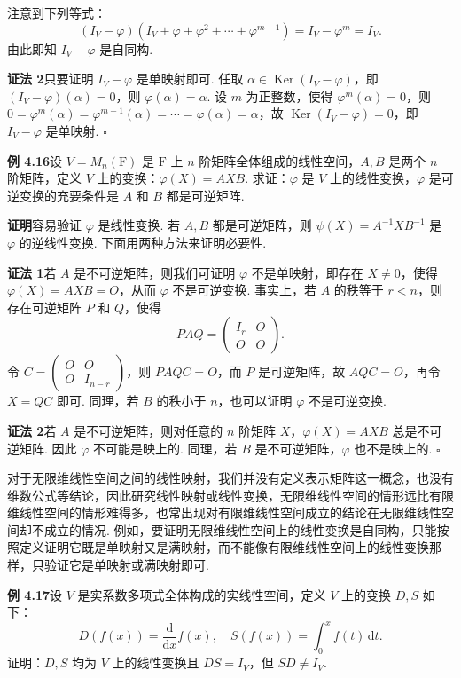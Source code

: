 \documentclass[UTF8,12pt,a4paper,fontset=fandol]{ctexart}
\begin{document}
注意到下列等式：
\[
(I_V-\varphi)(I_V+\varphi+\varphi^2+\cdots+\varphi^{m-1})=I_V-\varphi^m=I_V.
\]
由此即知 $I_V-\varphi$ 是自同构.

\noindent\textbf{证法 2}\quad 只要证明 $I_V-\varphi$ 是单映射即可. 任取 $\alpha\in\operatorname{Ker}(I_V-\varphi)$，即 $(I_V-\varphi)(\alpha)=0$，则 $\varphi(\alpha)=\alpha$. 设 $m$ 为正整数，使得 $\varphi^m(\alpha)=0$，则 $0=\varphi^m(\alpha)=\varphi^{m-1}(\alpha)=\cdots=\varphi(\alpha)=\alpha$，故 $\operatorname{Ker}(I_V-\varphi)=0$，即 $I_V-\varphi$ 是单映射. $\square$

\noindent\textbf{例 4.16}\quad 设 $V=M_n(\mathrm{F})$ 是 $\mathrm{F}$ 上 $n$ 阶矩阵全体组成的线性空间，$A,B$ 是两个 $n$ 阶矩阵，定义 $V$ 上的变换：$\varphi(X)=AXB$. 求证：$\varphi$ 是 $V$ 上的线性变换，$\varphi$ 是可逆变换的充要条件是 $A$ 和 $B$ 都是可逆矩阵.

\noindent\textbf{证明}\quad 容易验证 $\varphi$ 是线性变换. 若 $A,B$ 都是可逆矩阵，则 $\psi(X)=A^{-1}XB^{-1}$ 是 $\varphi$ 的逆线性变换. 下面用两种方法来证明必要性.

\noindent\textbf{证法 1}\quad 若 $A$ 是不可逆矩阵，则我们可证明 $\varphi$ 不是单映射，即存在 $X\ne0$，使得 $\varphi(X)=AXB=O$，从而 $\varphi$ 不是可逆变换. 事实上，若 $A$ 的秩等于 $r<n$，则存在可逆矩阵 $P$ 和 $Q$，使得
\[
PAQ=\left(\begin{array}{cc}
I_r & O\\
O & O
\end{array}\right).
\]
令 $C=\left(\begin{array}{cc}O&O\\ O&I_{n-r}\end{array}\right)$，则 $PAQC=O$，而 $P$ 是可逆矩阵，故 $AQC=O$，再令 $X=QC$ 即可. 同理，若 $B$ 的秩小于 $n$，也可以证明 $\varphi$ 不是可逆变换.

\noindent\textbf{证法 2}\quad 若 $A$ 是不可逆矩阵，则对任意的 $n$ 阶矩阵 $X$，$\varphi(X)=AXB$ 总是不可逆矩阵. 因此 $\varphi$ 不可能是映上的. 同理，若 $B$ 是不可逆矩阵，$\varphi$ 也不是映上的. $\square$

对于无限维线性空间之间的线性映射，我们并没有定义表示矩阵这一概念，也没有维数公式等结论，因此研究线性映射或线性变换，无限维线性空间的情形远比有限维线性空间的情形难得多，也常出现对有限维线性空间成立的结论在无限维线性空间却不成立的情况. 例如，要证明无限维线性空间上的线性变换是自同构，只能按照定义证明它既是单映射又是满映射，而不能像有限维线性空间上的线性变换那样，只验证它是单映射或满映射即可.

\noindent\textbf{例 4.17}\quad 设 $V$ 是实系数多项式全体构成的实线性空间，定义 $V$ 上的变换 $D,S$ 如下：
\[
D(f(x))=\frac{\mathrm{d}}{\mathrm{d}x}f(x),\quad S(f(x))=\int_0^x f(t)\,\mathrm{d}t.
\]
证明：$D,S$ 均为 $V$ 上的线性变换且 $DS=I_V$，但 $SD\ne I_V$.
\end{document}
